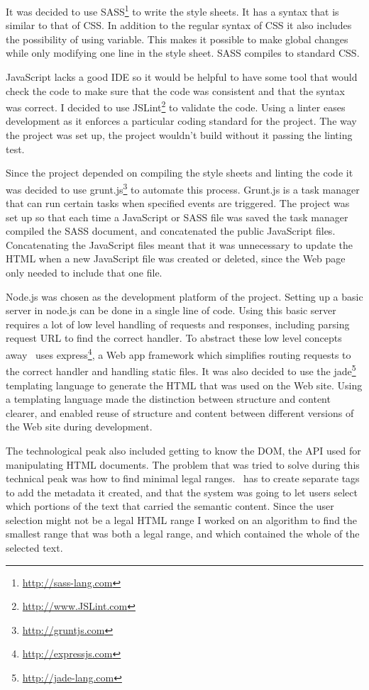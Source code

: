 It was decided to use SASS\footnote{\url{http://sass-lang.com}} to write the style sheets.
It has a syntax that is similar to that of CSS.
In addition to the regular syntax of CSS it also includes the possibility of using variable.
This makes it possible to make global changes while only modifying one line in the style sheet.
SASS compiles to standard CSS.

JavaScript lacks a good IDE so it would be helpful to have some tool that would check the code to make sure that the
code was consistent and that the syntax was correct.
I decided to use JSLint\footnote{\url{http://www.JSLint.com}} to validate the code.
Using a linter eases development as it enforces a particular coding standard for the project.
The way the project was set up, the project wouldn't build without it passing the linting test.

Since the project depended on compiling the style sheets and linting the code it was decided to use grunt.js\footnote{\url{http://gruntjs.com}}
to automate this process.
Grunt.js is a task manager that can run certain tasks when specified events are triggered.
The project was set up so that each time a JavaScript or SASS file was saved the task manager compiled the SASS document,
and concatenated the public JavaScript files.
Concatenating the JavaScript files meant that it was unnecessary to update the HTML when a new JavaScript file was created or deleted,
since the Web page only needed to include that one file.

Node.js was chosen as the development platform of the project.
Setting up a basic server in node.js can be done in a single line of code.
Using this basic server requires a lot of low level handling of requests and responses,
including parsing request URL to find the correct handler.
To abstract these low level concepts away \theartefact\ uses express\footnote{\url{http://expressjs.com}},
a Web app framework which simplifies routing requests to the correct handler and handling static files.
It was also decided to use the jade\footnote{\url{http://jade-lang.com}}
templating language to generate the HTML that was used on the Web site.
Using a templating language made the distinction between structure and content clearer,
and enabled reuse of structure and content between different versions of the Web site during development.

The technological peak also included getting to know the DOM, the API used for manipulating HTML documents.
The problem that was tried to solve during this technical peak was how to find minimal legal ranges.
\Theartefact\ has to create separate tags to add the metadata it created,
and that the system was going to let users select which portions of the text that carried the semantic content.
Since the user selection might not be a legal HTML range I worked on an algorithm to find the smallest range that
was both a legal range, and which contained the whole of the selected text.



